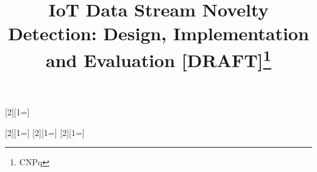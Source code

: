 \documentclass[conference]{IEEEtran}
\newcounter{todocounter}
\begin{document}
\title{IoT Data Stream Novelty Detection:
Design, Implementation and Evaluation [DRAFT]\thanks{CNPq}}

\author{
}

\maketitle

\newcommand{\toreview}{}
\newcommand{\reffig}[1]{Figure \ref{fig:#1}\xspace}

\ifx\toreview\undefined
  [2][1=]{}
  \newcommand{\hl}[1]{}

  [2][1=]{}
  \newcommand{\hlhl}[1]{}
  [2][1=]{}
  \newcommand{\hlke}[1]{}
  [2][1=]{}
  \newcommand{\hlfa}[1]{}
\else
  \newcommand{\hl}[1]{\colorbox{red!25}{#1}}
  \newenvironment{highlight}{\begin{mdframed}[backgroundcolor=red!25]}{\end{mdframed}}

\end{document}
